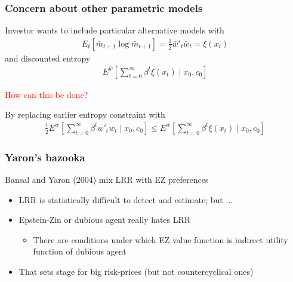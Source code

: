\documentclass{beamer}
\theoremstyle{Definition}
\begin{document}
\begin{frame}[fragile]
  \frametitle{Concern about other parametric models}

Investor wants  to include particular alternative models with
\begin{align*}
E_t \left[\bar m_{t+1}\log \bar m_{t+1} \right]= \frac{1}{2}\bar w'_t \bar w_t = \xi(x_t)
\end{align*} and
discounted entropy
\begin{align*}
E^{\bar w}\left[ \sum_{t=0}^{\infty} \beta^t \xi(x_t)  \mid x_0, c_0 \right]
\end{align*}


{\textcolor{red}{How can this be done? }} 

By replacing earlier entropy constraint with
\begin{align*}
\frac{1}{2}E^{w}\left[ \sum_{t=0}^{\infty} \beta^t w'_t w_t  \mid x_0, c_0 \right] \leq E^{w}\left[ \sum_{t=0}^{\infty} \beta^t \xi(x_t)  \mid x_0, c_0 \right]
\end{align*} 
\end{frame}


\begin{frame}[fragile]
\frametitle{Yaron's bazooka}

Bansal and Yaron (2004) mix LRR with EZ preferences \\


\begin{itemize}
\item LRR is statistically difficult to detect and  estimate; but $\ldots$
\item Epstein-Zin or dubious agent really hates LRR
\begin{itemize}
\item \small{There are conditions under which EZ value function is  indirect utility function of dubious  agent}
\end{itemize}
\item That sets  stage for big risk-prices (but not countercyclical ones)
\end{itemize}

\end{frame}
\end{document}
